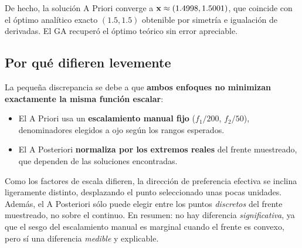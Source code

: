 De hecho, la solución A Priori converge a $\mathbf{x} \approx
(\num{1.4998}, \num{1.5001})$, que coincide con el
óptimo analítico exacto $(1.5, 1.5)$ obtenible por simetría e igualación de
derivadas. El GA recuperó el óptimo teórico sin error apreciable.

\subsection{Por qué difieren levemente}

La pequeña discrepancia se debe a que \textbf{ambos enfoques no minimizan
exactamente la misma función escalar}:

\begin{itemize}[noitemsep]
  \item El A Priori usa un \textbf{escalamiento manual fijo} ($f_1/200$,
        $f_2/50$), denominadores elegidos a ojo según los rangos esperados.
  \item El A Posteriori \textbf{normaliza por los extremos reales} del frente
        muestreado, que dependen de las \MetNSol{} soluciones encontradas.
\end{itemize}

Como los factores de escala difieren, la dirección de preferencia efectiva se
inclina ligeramente distinto, desplazando el punto seleccionado unas pocas
unidades. Además, el A Posteriori sólo puede elegir entre los puntos
\emph{discretos} del frente muestreado, no sobre el continuo. En resumen: no
hay diferencia \emph{significativa}, ya que el sesgo del escalamiento manual es
marginal cuando el frente es convexo, pero sí una diferencia \emph{medible}
y explicable.
